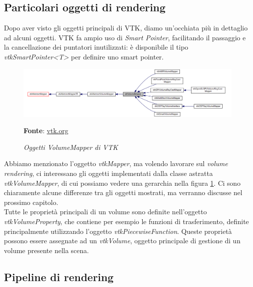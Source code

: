\subsection{Particolari oggetti di rendering}\label{sec:special-rendering}
Dopo aver visto gli oggetti principali di VTK, diamo un'occhiata più in dettaglio ad alcuni oggetti. VTK fa ampio uso di \emph{Smart Pointer}, facilitando il passaggio e la cancellazione dei puntatori inutilizzati: è disponibile il tipo \emph{vtkSmartPointer<T>} per definire uno smart pointer.

\begin{figure}[h]
    \centering
    \includegraphics[scale=0.4]{immagini/volumerendering/mappers.png}
    \caption{\textit{Oggetti VolumeMapper di VTK}}
    \textbf{Fonte}: \href{https://vtk.org/doc/nightly/html/classvtkVolumeMapper.html}{vtk.org}
    \label{fig: Gerarchia di VolumeMapper}
\end{figure}

Abbiamo menzionato l'oggetto \emph{vtkMapper}, ma volendo lavorare sul \emph{volume rendering}, ci interessano gli oggetti implementati dalla classe astratta \emph{vtkVolumeMapper}, di cui possiamo vedere una gerarchia nella figura \ref{fig: Gerarchia di VolumeMapper}. Ci sono chiaramente alcune differenze tra gli oggetti mostrati, ma verranno discusse nel prossimo capitolo.
\\
Tutte le proprietà principali di un volume sono definite nell'oggetto \emph{vtkVolumeProperty}, che contiene per esempio le funzioni di trasferimento, definite principalmente utilizzando l'oggetto \emph{vtkPiecewiseFunction}. Queste proprietà possono essere assegnate ad un \emph{vtkVolume}, oggetto principale di gestione di un volume presente nella scena.

\subsection{Pipeline di rendering}

